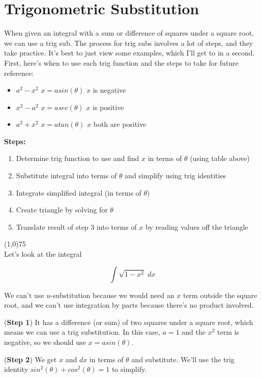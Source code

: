 \documentclass[12pt]{report}
\begin{document}
\section{Trigonometric Substitution}
When given an integral with a sum or difference of squares under a square root, we can use a trig sub. The process for trig subs involves a lot of steps, and they take practice. It's best to just view some examples, which I'll get to in a second. First, here's when to use each trig function and the steps to take for future reference:

\begin{itemize}
	\item[] $ a^2 - x^2 $ \quad \quad $x = asin(\theta)$ \quad \quad $x$ is negative
	\item[] $ x^2 - a^2 $ \quad \quad $x = asec(\theta)$ \quad \quad $x$ is positive
	\item[] $ a^2 + x^2 $ \quad \quad $x = atan(\theta)$ \quad \quad $x$ both are positive
\end{itemize}

\noindent \textbf{Steps:}
\begin{enumerate}
	\item Determine trig function to use and find $x$ in terms of $\theta$ (using table above)
	\item Substitute integral into terms of $\theta$ and simplify using trig identities
	\item Integrate simplified integral (in terms of $\theta$)
	\item Create triangle by solving for $\theta$
	\item Translate result of step 3 into terms of $x$ by reading values off the triangle
	
\end{enumerate}

\line(1,0){75} \\

Let's look at the integral

$$ \int \sqrt{1-x^2} \; dx $$

We can't use $u$-substitution because we would need an $x$ term outside the square root, and we can't use integration by parts because there's no product involved.

(\textbf{Step 1}) It has a difference (or sum) of two squares under a square root, which means we can use a trig substitution. In this case, $ a = 1 $ and the $x^2$ term is negative, so we should use $ x = asin(\theta) $. 

(\textbf{Step 2}) We get $x$ and $dx$ in terms of $\theta$ and substitute. We'll use the trig identity $ sin^2(\theta) + cos^2(\theta) = 1 $ to simplify.
\end{document}
